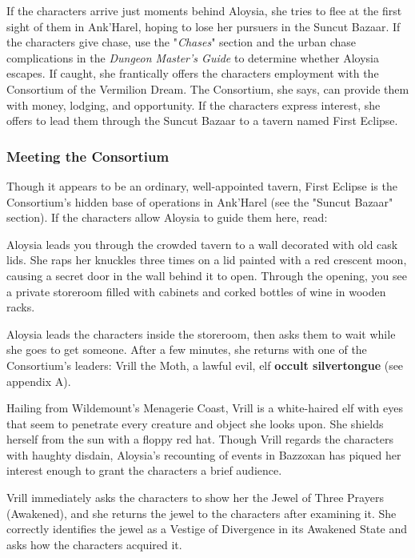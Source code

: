 \documentclass[10pt,a4paper,twoside,bg=print,twocolumn,openany,nodeprecatedcode]{dndbook}
\begin{document}
If the characters arrive just moments behind Aloysia, she tries to flee at the first sight of them in Ank'Harel, hoping to lose her pursuers in the Suncut Bazaar. If the characters give chase, use the "\textit{Chases}" section and the urban chase complications in the \textit{Dungeon Master's Guide} to determine whether Aloysia escapes. If caught, she frantically offers the characters employment with the Consortium of the Vermilion Dream. The Consortium, she says, can provide them with money, lodging, and opportunity. If the characters express interest, she offers to lead them through the Suncut Bazaar to a tavern named First Eclipse.

\subsubsection{Meeting the Consortium}
Though it appears to be an ordinary, well-appointed tavern, First Eclipse is the Consortium's hidden base of operations in Ank'Harel (see the "Suncut Bazaar" section). If the characters allow Aloysia to guide them here, read:

\begin{DndReadAloud}{}
Aloysia leads you through the crowded tavern to a wall decorated with old cask lids. She raps her knuckles three times on a lid painted with a red crescent moon, causing a secret door in the wall behind it to open. Through the opening, you see a private storeroom filled with cabinets and corked bottles of wine in wooden racks.

\end{DndReadAloud}

Aloysia leads the characters inside the storeroom, then asks them to wait while she goes to get someone. After a few minutes, she returns with one of the Consortium's leaders: Vrill the Moth, a lawful evil, elf \textbf{occult silvertongue} (see appendix A).

Hailing from Wildemount's Menagerie Coast, Vrill is a white-haired elf with eyes that seem to penetrate every creature and object she looks upon. She shields herself from the sun with a floppy red hat. Though Vrill regards the characters with haughty disdain, Aloysia's recounting of events in Bazzoxan has piqued her interest enough to grant the characters a brief audience.

Vrill immediately asks the characters to show her the Jewel of Three Prayers (Awakened), and she returns the jewel to the characters after examining it. She correctly identifies the jewel as a Vestige of Divergence in its Awakened State and asks how the characters acquired it.
\end{document}
